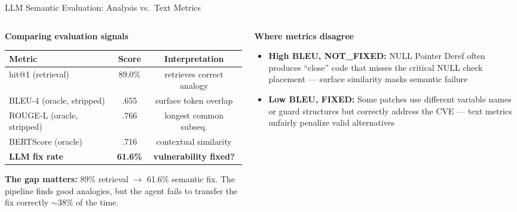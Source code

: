 \documentclass[aspectratio=169,10pt]{beamer}
\begin{document}
\begin{frame}{LLM Semantic Evaluation: Analysis vs.\ Text Metrics}

  \begin{columns}[T]
  \begin{column}{0.48\textwidth}

    \textbf{Comparing evaluation signals}

    \vspace{0.4em}
    {\scriptsize
    \renewcommand{\arraystretch}{1.35}
    \begin{tabular}{l c c}
      \toprule
      \textbf{Metric} & \textbf{Score} & \textbf{Interpretation} \\
      \midrule
      hit@1 (retrieval)          & 89.0\% & retrieves correct analogy \\
      BLEU-4 (oracle, stripped)  & .655   & surface token overlap \\
      ROUGE-L (oracle, stripped) & .766   & longest common subseq. \\
      BERTScore (oracle)         & .716   & contextual similarity \\
      \midrule
      \rowcolor{c1!8}
      \textbf{LLM fix rate}     & \textbf{61.6\%} & \textbf{vulnerability fixed?} \\
      \bottomrule
    \end{tabular}}

    \vspace{0.6em}
    {\scriptsize\textcolor{c1}{}
    \textbf{The gap matters:} 89\% retrieval $\to$ 61.6\% semantic fix.
    The pipeline finds good analogies, but the agent fails to
    transfer the fix correctly $\sim$38\% of the time.}

  \end{column}
  \begin{column}{0.48\textwidth}

    \textbf{Where metrics disagree}

    \vspace{0.4em}
    {\scriptsize
    \begin{itemize}\setlength{\itemsep}{3pt}
      \item \textbf{High BLEU, NOT\_FIXED:}
            NULL Pointer Deref often produces ``close'' code
            that misses the critical NULL check placement ---
            surface similarity masks semantic failure

      \item \textbf{Low BLEU, FIXED:}
            Some patches use different variable names or
            guard structures but correctly address the CVE ---
            text metrics unfairly penalize valid alternatives


\end{itemize}}
\end{column}
\end{columns}
\end{frame}
\end{document}
